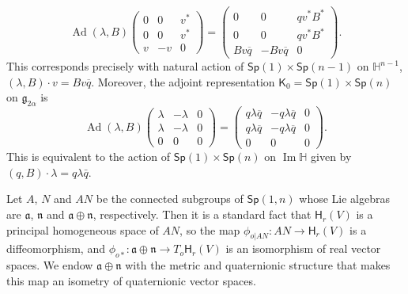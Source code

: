 \documentclass[12pt, a4paper,draft]{amsart}
\newcommand{\g}{\mathfrak}
\newcommand{\Ad}{\operatorname{Ad}}
\renewcommand{\H}{\mathbb{H}}
\renewcommand{\Im}{\operatorname{Im}}
\newcommand{\Sp}{\mathsf{Sp}}
\theoremstyle{remark}
\begin{document}
\[
\Ad(\lambda,B)\left(
\begin{array}{cc|c}
	0 & 0 & v^*\\
	0 & 0 & v^*\\
	\hline
	v & -v & 0
\end{array}
\right)
=\left(
\begin{array}{cc|c}
	0 & 0 & qv^*B^*\\
	0 & 0 & qv^*B^*\\
	\hline
	Bv\overline{q} & -Bv\overline{q} & 0
\end{array}
\right).
\]
This corresponds precisely with natural action of $\mathsf{Sp}(1)\times\mathsf{Sp}(n-1)$ on $\H^{n-1}$, $(\lambda,B)\cdot v=Bv\overline{q}$.
Moreover, the adjoint representation $\mathsf{K}_{0}=\Sp(1)\times\Sp(n)$ on $\g{g}_{2\alpha}$ is
\[
\Ad(\lambda,B)\left(
\begin{array}{cc|c}
	\lambda & -\lambda & 0\\
	\lambda & -\lambda & 0\\
	\hline
	0 & 0 & 0
\end{array}
\right)
=\left(
\begin{array}{cc|c}
	q\lambda\overline{q} & -q\lambda\overline{q} & 0\\
	q\lambda\overline{q} & -q\lambda\overline{q} & 0\\
	\hline
	0 & 0 & 0
\end{array}
\right).
\]
This is equivalent to the action of $\Sp(1)\times\Sp(n)$ on $\Im\H$ given by $(q,B)\cdot \lambda=q\lambda\bar{q}$.
	
Let ${A}$, ${N}$ and ${AN}$ be the connected subgroups of $\mathsf{Sp}(1,n)$ whose Lie algebras are $\g{a}$, $\g{n}$ and $\g{a}\oplus \g{n}$, respectively.
Then it is a standard fact that $\mathsf{H}_r(V)$ is a principal homogeneous space of ${AN}$, 
so the map $\phi_{o\vert AN}\colon AN\to \mathsf{H}_r(V)$ is a diffeomorphism,
and $\phi_{o*}\colon\g{a}\oplus\g{n}\to T_o\mathsf{H}_r(V)$ is an isomorphism of real vector spaces.
We endow $\g{a}\oplus\g{n}$ with the metric and quaternionic structure that makes this map an isometry of quaternionic vector spaces.
\end{document}
